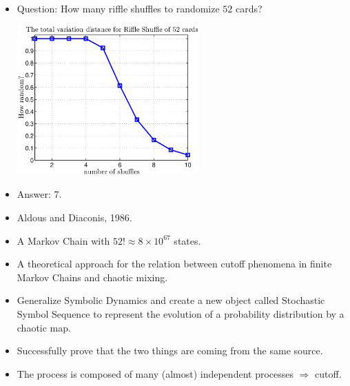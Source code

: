 \documentclass[12pt,t]{beamer}
\begin{document}
\begin{frame}
  \begin{itemize}
  \item Question: How many riffle shuffles to randomize $52$ cards?
    \begin{center}
      \includegraphics[width=0.55\textwidth,trim=1cm 1cm 0cm 0cm]{riffleshuffle}
    \end{center}
  \item Answer: 7.
  \item Aldous and Diaconis, 1986.
  \item A Markov Chain with $52! \approx 8 \times 10^{67}$ states.
  \end{itemize}
\end{frame}


\begin{frame}
  \begin{itemize}
   \item A theoretical approach for the relation between cutoff phenomena in finite Markov Chains and chaotic mixing. 
   \item Generalize Symbolic Dynamics and create a new object called Stochastic Symbol Sequence to represent the evolution of a probability distribution by a chaotic map. 
   \item Successfully prove that the two things are coming from the same source.
   \item The process is composed of many (almost) independent processes $\Longrightarrow$ cutoff. 
  \end{itemize}
\end{frame}
\end{document}
